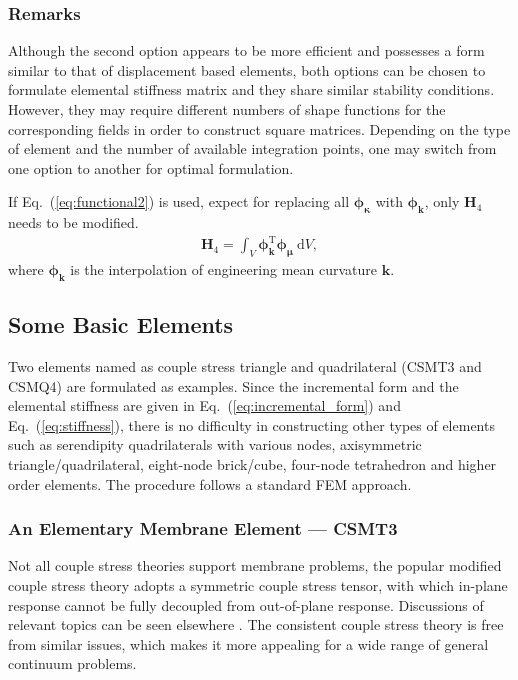 \documentclass[3p,sort&compress,11pt,fleqn]{elsarticle}
\newcommand*{\eqsref}[1]{Eq.~(\ref{#1})}
\newcommand*{\mT}{\mathrm{T}}
\newcommand*{\md}[1]{\mathrm{d}#1}
\begin{document}
\subsubsection{Remarks}
Although the second option appears to be more efficient and possesses a form similar to that of displacement based elements, both options can be chosen to formulate elemental stiffness matrix and they share similar stability conditions. However, they may require different numbers of shape functions for the corresponding fields in order to construct square matrices. Depending on the type of element and the number of available integration points, one may switch from one option to another for optimal formulation.

If \eqsref{eq:functional2} is used, expect for replacing all $\mathbold{\phi}_\mathbold{\kappa}$ with $\mathbold{\phi}_\mathbold{k}$, only $\mathbold{H}_4$ needs to be modified.
\begin{gather}
\mathbold{H}_4=\int_V\mathbold{\phi}_\mathbold{k}^\mT\mathbold{\phi}_\mathbold{\mu}~\md{V},
\end{gather}
where $\mathbold{\phi}_\mathbold{k}$ is the interpolation of engineering mean curvature $\mathbold{k}$.
\subsection{Some Basic Elements}
Two elements named as couple stress triangle and quadrilateral (CSMT3 and CSMQ4) are formulated as examples. Since the incremental form and the elemental stiffness are given in \eqsref{eq:incremental_form} and \eqsref{eq:stiffness}, there is no difficulty in constructing other types of elements such as serendipity quadrilaterals with various nodes, axisymmetric triangle/quadrilateral, eight-node brick/cube, four-node tetrahedron and higher order elements. The procedure follows a standard FEM approach.
\subsubsection{An Elementary Membrane Element --- CSMT3}
Not all couple stress theories support membrane problems, the popular modified couple stress theory \citep{Yang2002} adopts a symmetric couple stress tensor, with which in-plane response cannot be fully decoupled from out-of-plane response. Discussions of relevant topics can be seen elsewhere \citep{Hadjesfandiari2016}. The consistent couple stress theory is free from similar issues, which makes it more appealing for a wide range of general continuum problems.
\end{document}
